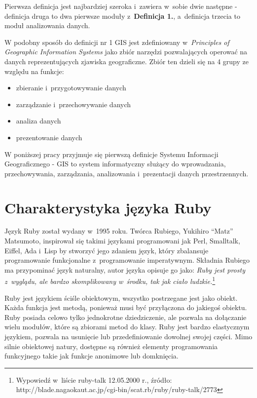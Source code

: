 \documentclass[printmode]{mgr}
\begin{document}
Pierwsza definicja jest najbardziej szeroka i~zawiera w~sobie dwie następne - definicja druga to dwa pierwsze moduły z~\textbf{Definicja 1.}, a~definicja trzecia to moduł analizowania danych.

W podobny sposób do definicji nr 1 GIS jest zdefiniowany w~\emph{Principles of Geographic Information Systems} \cite{principles_gis} jako zbiór narzędzi pozwalających operować na danych reprezentujących zjawiska geograficzne. Zbiór ten dzieli się na 4 grupy ze względu na funkcje:
  \begin{itemize}
    \item zbieranie i~przygotowywanie danych
    \item zarządzanie i~przechowywanie danych
    \item analiza danych
    \item prezentowanie danych
  \end{itemize}

W poniższej pracy przyjmuje się pierwszą definicje Systemu Informacji Geograficznego - GIS to system informatyczny służący do wprowadzania, przechowywania, zarządzania, analizowania i~prezentacji danych przestrzennych.

\section{Charakterystyka języka Ruby}
Język Ruby został wydany w~1995 roku. Twórca Rubiego, Yukihiro “Matz” Matsumoto, inspirował się takimi językami programowani jak Perl, Smalltalk, Eiffel, Ada i~Lisp by stworzyć jego zdaniem język, który zbalansuje programowanie funkcjonalne z~programowanie imperatywnym. \cite{doc_ruby} Składnia Rubiego ma przypominać język naturalny, autor języka opisuje go jako: \emph{Ruby jest prosty z~wyglądu, ale bardzo skomplikowany w~środku, tak jak ciało ludzkie.}\footnote{Wypowiedź w~liście ruby-talk 12.05.2000 r., źródło: \\http://blade.nagaokaut.ac.jp/cgi-bin/scat.rb/ruby/ruby-talk/2773}

Ruby jest językiem ściśle obiektowym, wszystko postrzegane jest jako obiekt. Każda funkcja jest metodą, ponieważ musi być przyłączona do jakiegoś obiektu. Ruby posiada celowo tylko jednokrotne dziedziczenie, ale pozwala na dołączanie wielu modułów, które są zbiorami metod do klasy. Ruby jest bardzo elastycznym językiem, pozwala na usunięcie lub przedefiniowanie dowolnej swojej części. Mimo silnie obiektowej natury, dostępne są również elementy programowania funkcyjnego takie jak funkcje anonimowe lub domknięcia.
\end{document}
